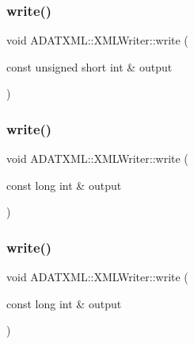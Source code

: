 \subsubsection{\texorpdfstring{write()}{write()}\hspace{0.1cm}{\footnotesize\ttfamily [15/30]}}
{\footnotesize\ttfamily void A\+D\+A\+T\+X\+M\+L\+::\+X\+M\+L\+Writer\+::write (\begin{DoxyParamCaption}\item[{const unsigned short int \&}]{output }\end{DoxyParamCaption})}

\mbox{\label{classADATXML_1_1XMLWriter_a39b29ce03b5b71ef853e1952d1899d73}} 
\subsubsection{\texorpdfstring{write()}{write()}\hspace{0.1cm}{\footnotesize\ttfamily [16/30]}}
{\footnotesize\ttfamily void A\+D\+A\+T\+X\+M\+L\+::\+X\+M\+L\+Writer\+::write (\begin{DoxyParamCaption}\item[{const long int \&}]{output }\end{DoxyParamCaption})}

\mbox{\label{classADATXML_1_1XMLWriter_a39b29ce03b5b71ef853e1952d1899d73}} 
\subsubsection{\texorpdfstring{write()}{write()}\hspace{0.1cm}{\footnotesize\ttfamily [17/30]}}
{\footnotesize\ttfamily void A\+D\+A\+T\+X\+M\+L\+::\+X\+M\+L\+Writer\+::write (\begin{DoxyParamCaption}\item[{const long int \&}]{output }\end{DoxyParamCaption})}

